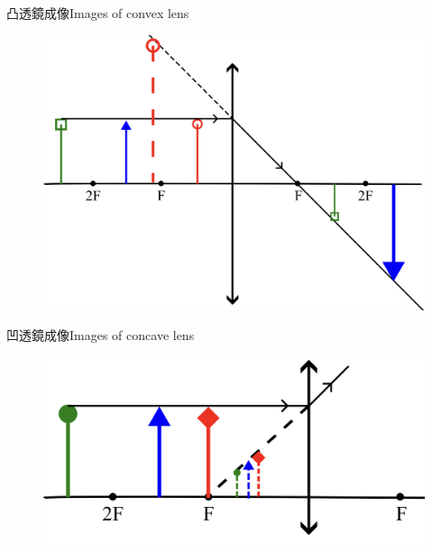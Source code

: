 \documentclass[beamer=true]{standalone}
\begin{document}
\begin{frame}{凸透鏡成像Images of convex lens}
    \begin{figure}
        \centering
        \includegraphics[width=1\linewidth]{assets/dqdqwdund3.png}


    \end{figure}
\end{frame}

\begin{frame}{凹透鏡成像Images of concave lens}
    \begin{figure}
        \centering
        \includegraphics[width=1\linewidth]{assets/jdnd3d23dc.png}


    \end{figure}
\end{frame}
\end{document}
